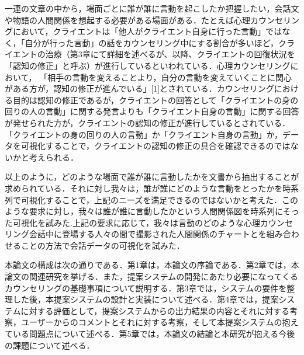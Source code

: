 \documentclass[shuuron]{kuee}
\begin{document}
一連の文章の中から，場面ごとに誰が誰に言動を起こしたか把握したい，会話文や物語の人間関係を想起する必要がある場面がある．たとえば心理カウンセリングにおいて，クライエントは「他人がクライエント自身に行った言動」ではなく，「自分が行った言動」の話をカウンセリング中にする割合が多いほど，クライエントの治療（第3章にて詳細を述べるが、以降、クライエントの回復状況を「認知の修正」と呼ぶ）が進行しているといわれている．心理カウンセリングにおいて， 「相手の言動を変えることより，自分の言動を変えていくことに関心がある方が，認知の修正が進んでいる」[1]とされている．カウンセリングにおける目的は認知の修正であるが，クライエントの回答として「クライエントの身の回りの人の言動」に関する発言よりも「クライエント自身の言動」に関する回答が発せられた方が，クライエントの認知の修正が進行しているとされている．「クライエントの身の回りの人の言動」か「クライエント自身の言動」か，データを可視化することで，クライエントの認知の修正の具合を確認できるのではないかと考えられる．

以上のように，どのような場面で誰が誰に言動したかを文書から抽出することが求められている．それに対し我々は，誰が誰にどのような言動をとったかを時系列で可視化することで，上記のニーズを満足できるのではないかと考えた．このような要求に対し，我々は誰が誰に言動したかという人間関係図を時系列にそった可視化を試みた.上記の要求に応じて，我々は言動のどのような心理カウンセリング会話中に登場する人々の間で撮影された人間関係のチャートとを組み合わせることの方法で会話データの可視化を試みた．

本論文の構成は次の通りである．第1章は，本論文の序論である．第2章では，本論文の関連研究を挙げる．また，提案システムの開発にあたり必要になってくるカウンセリングの基礎事項について説明する．第3章では，システムの要件を整理した後，本提案システムの設計と実装について述べる．第4章では，提案システムに対する評価として，提案システムからの出力結果の内容とそれに対する考察，ユーザーからのコメントとそれに対する考察，そして本提案システムの抱えている問題点について述べる．第5章では，本論文の結論と本研究が抱える今後の課題について述べる．

%
\end{document}
